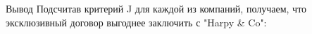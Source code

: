 \documentclass[8pt]{beamer}
\begin{document}
\begin{frame}{Вывод}
Подсчитав критерий J для каждой из компаний, получаем, что эксклюзивный договор выгоднее заключить с "Harpy \& Co":\\
\begin{figure}[h]
\begin{minipage}[h]{0.49\linewidth}
\end{minipage}
\hfill
\begin{minipage}[h]{0.49\linewidth}
\end{minipage}
\label{ris:image9}
\end{figure}
\end{frame}
\end{document}
